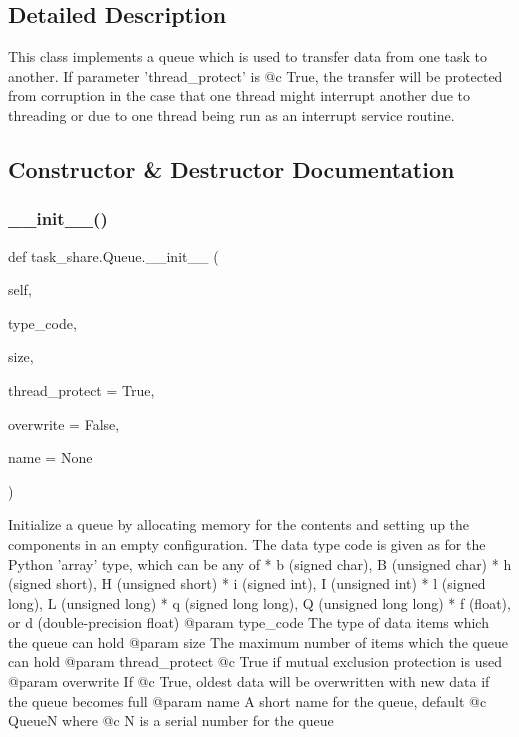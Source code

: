 \subsection{Detailed Description}
\begin{DoxyVerb}This class implements a queue which is used to transfer data from one
task to another. If parameter 'thread_protect' is @c True, the transfer 
will be protected from corruption in the case that one thread might 
interrupt another due to threading or due to one thread being run as an 
interrupt service routine. \end{DoxyVerb}
 

\subsection{Constructor \& Destructor Documentation}
\mbox{\label{classtask__share_1_1Queue_a91ce05bf47c2634013fdb2689c2b207f}} 
\subsubsection{\texorpdfstring{\+\_\+\+\_\+init\+\_\+\+\_\+()}{\_\_init\_\_()}}
{\footnotesize\ttfamily def task\+\_\+share.\+Queue.\+\_\+\+\_\+init\+\_\+\+\_\+ (\begin{DoxyParamCaption}\item[{}]{self,  }\item[{}]{type\+\_\+code,  }\item[{}]{size,  }\item[{}]{thread\+\_\+protect = {\ttfamily True},  }\item[{}]{overwrite = {\ttfamily False},  }\item[{}]{name = {\ttfamily None} }\end{DoxyParamCaption})}

\begin{DoxyVerb}Initialize a queue by allocating memory for the contents and 
setting up the components in an empty configuration. The data type 
code is given as for the Python 'array' type, which can be any of
* b (signed char), B (unsigned char)
* h (signed short), H (unsigned short)
* i (signed int), I (unsigned int)
* l (signed long), L (unsigned long)
* q (signed long long), Q (unsigned long long)
* f (float), or d (double-precision float)
@param type_code The type of data items which the queue can hold
@param size The maximum number of items which the queue can hold
@param thread_protect @c True if mutual exclusion protection is used
@param overwrite If @c True, oldest data will be overwritten with new
    data if the queue becomes full 
@param name A short name for the queue, default @c QueueN where @c N
    is a serial number for the queue \end{DoxyVerb}
 

